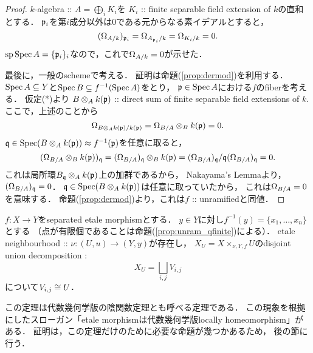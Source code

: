 \documentclass[a4paper, dvipdfmx]{jsarticle}
\begin{document}
\begin{proof}
    $k$-algebra :: $A=\bigoplus_i K_i$を
    $K_i$ :: finite separable field extension of $k$の直和とする．
    $\mathfrak{p}_i$を第$i$成分以外は$0$である元からなる素イデアルとすると，
    \[ (\Omega_{A/k})_{\mathfrak{p}_i}=\Omega_{A_{\mathfrak{p}_i}/k}=\Omega_{K_i/k}=0. \]
    $\operatorname{sp} \operatorname{Spec} A=\{ \mathfrak{p}_i \}_i$なので，これで$\Omega_{A/k}=0$が示せた．

    最後に，一般のschemeで考える．
    証明は命題(\ref{prop:dermod})を利用する．
    $\operatorname{Spec} A \subseteq Y$と$\operatorname{Spec} B \subseteq f^{-1}(\operatorname{Spec} A)$をとり，
    $\mathfrak{p} \in \operatorname{Spec} A$における$f$のfiberを考える．
    仮定(*)より
    $B \otimes_{A} k(\mathfrak{p})$ :: direct sum of finite separable field extensions of $k$.
    ここで，上述のことから
    \[ \Omega_{B \otimes_{A} k(\mathfrak{p})/k(\mathfrak{p})}=\Omega_{B/A} \otimes_{B} k(\mathfrak{p})=0. \]
    $\mathfrak{q} \in \operatorname{Spec} (B \otimes_A k(\mathfrak{p})) \approx f^{-1}(\mathfrak{p})$を任意に取ると，
    \[
        ( \Omega_{B/A} \otimes_{B} k(\mathfrak{p}) )_{\mathfrak{q}}
        =(\Omega_{B/A})_{\mathfrak{q}} \otimes_{B} k(\mathfrak{p})
        =(\Omega_{B/A})_{\mathfrak{q}}/\mathfrak{q}(\Omega_{B/A})_{\mathfrak{q}}
        =0.
    \]
    これは局所環$B_{\mathfrak{q}} \otimes_A k(\mathfrak{p})$上の加群であるから，
    Nakayama's Lemmaより，$(\Omega_{B/A})_{\mathfrak{q}}=0$．
    $\mathfrak{q} \in \operatorname{Spec} (B \otimes_A k(\mathfrak{p}))$は任意に取っていたから，
    これは$\Omega_{B/A}=0$を意味する．
    命題(\ref{prop:dermod})より，これは$f$ :: unramifiedと同値．
\end{proof}

\begin{Thm} \label{thm:impfunc}
    $f \colon X \to Y$をseparated etale morphismとする．
    $y \in Y$に対し$f^{-1}(y)=\{x_1,\dots,x_n \}$とする
    （点が有限個であることは命題(\ref{prop:unram_qfinite})による）．
    etale neighbourhood :: $\nu: (U, u) \to (Y, y)$が存在し，
    $X_U=X \times_{\nu, Y, f} U$のdisjoint union decomposition :
    \[ X_U=\bigsqcup_{i, j} V_{i, j} \]
    について$V_{i, j} \cong U$．
\end{Thm}

\begin{Remark}
この定理は代数幾何学版の陰関数定理とも呼べる定理である．
この現象を根拠にしたスローガン「etale morphismは代数幾何学版locally homeomorphism」がある．
証明は，この定理だけのために必要な命題が幾つかあるため，
後の節に行う．
\end{Remark}
\end{document}

